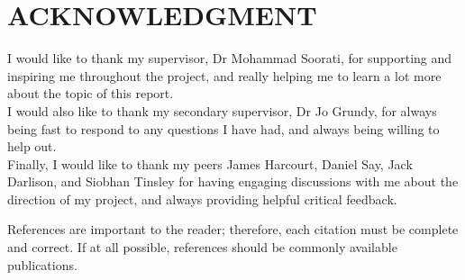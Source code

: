\documentclass[letterpaper, 10 pt, conference]{ieeeconf}  %
\begin{document}
\section*{ACKNOWLEDGMENT}

I would like to thank my supervisor, Dr Mohammad Soorati, for supporting and inspiring me throughout the project, and really helping me to learn a lot more about the topic of this report.\\

I would also like to thank my secondary supervisor, Dr Jo Grundy, for always being fast to respond to any questions I have had, and always being willing to help out.\\

Finally, I would like to thank my peers James Harcourt, Daniel Say, Jack Darlison, and Siobhan Tinsley for having engaging discussions with me about the direction of my project, and always providing helpful critical feedback.




References are important to the reader; therefore, each citation must be complete and correct. If at all possible, references should be commonly available publications.




{}
\end{document}
